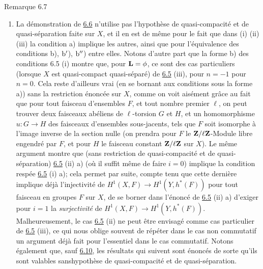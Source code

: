 \documentclass[10pt]{../fichiers-configuration-latex/smfart}
\begin{document}
\begin{enonce*}[remark]{Remarque 6.7}
\begin{enumerate}
\item La démonstration de \hyperref[XII.cor6.6]{6.6} n'utilise pas l'hypothèse de
quasi-compacité et de quasi-séparation faite sur $X$, et il en est de
même pour le fait que dans (i) (ii) (iii) la condition a) implique les
autres, ainsi que pour l'équivalence des conditions b), ${\rm b'}$),
${\rm b''}$) entre elles. Notons d'autre part que la forme b) des
conditions 6.5 (i) montre que, pour $\mathbf{L}=\phi$, ce sont des cas
particuliers (lorsque $X$ est quasi-compact quasi-séparé) de \hyperref[XII.prop6.5]{6.5}
(iii), pour $n=-1$ \resp pour $n=0$. Cela reste d'ailleurs vrai (en
se bornant aux conditions sous la forme a)) sans la restriction
énoncée sur $X$, comme on voit aisément grâce au fait que pour tout
faisceau d'ensembles $F$, et tout nombre premier $\ell$, on peut
trouver deux faisceaux abéliens de $\ell$-torsion $G$ et $H$, et un
homomorphisme $u:G\rightarrow H$ des faisceaux d'ensembles
sous-jacents, tels que $F$ soit isomorphe à l'image inverse de la
section nulle (on prendra pour $F$ le $\mathbf{Z}/\ell
\mathbf{Z}$-Module libre engendré par $F$, et pour $H$ le faisceau
constant $\mathbf{Z}/\ell\mathbf{Z}$ sur $X$). Le même argument montre
que (sans restriction de quasi-compacité et de quasi-séparation) \hyperref[XII.prop6.5]{6.5}
(ii) a) (où il suffit même de faire $i=0$) implique la condition
respée \hyperref[XII.prop6.5]{6.5} (i) a); cela permet par suite, compte tenu que cette
dernière implique déjà l'injectivité de $H^1(X,F)\rightarrow
H^1(Y,h^{\ast}(F))$ pour tout faisceau en groupes $F$ sur $X$, de se
borner dans l'énoncé de \hyperref[XII.prop6.5]{6.5} (ii) a) d'exiger pour $i=1$ la
\emph{surjectivité} de $H^1(X,F)\rightarrow
H^1(Y,h^{\ast}(F))$. Malheureusement, le cas \hyperref[XII.prop6.5]{6.5} (ii) ne peut être
envisagé comme cas particulier de \hyperref[XII.prop6.5]{6.5} (iii), ce qui nous oblige
souvent de répéter dans le cas non commutatif un argument déjà fait
pour l'essentiel dans le cas commutatif. Notons également que, sauf
\hyperref[XII.cor6.10]{6.10}, les résultats qui suivent sont énoncés de sorte qu'ils sont valables
sans\pageoriginale hypothèse de quasi-compacité et de quasi-séparation.
\end{enumerate}
\end{enonce*}
\end{document}
